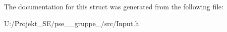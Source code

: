 The documentation for this struct was generated from the following file\+:\begin{DoxyCompactItemize}
\item 
U\+:/\+Projekt\+\_\+\+S\+E/pse\+\_\+\_\+gruppe\+\_/src/Input.\+h\end{DoxyCompactItemize}

